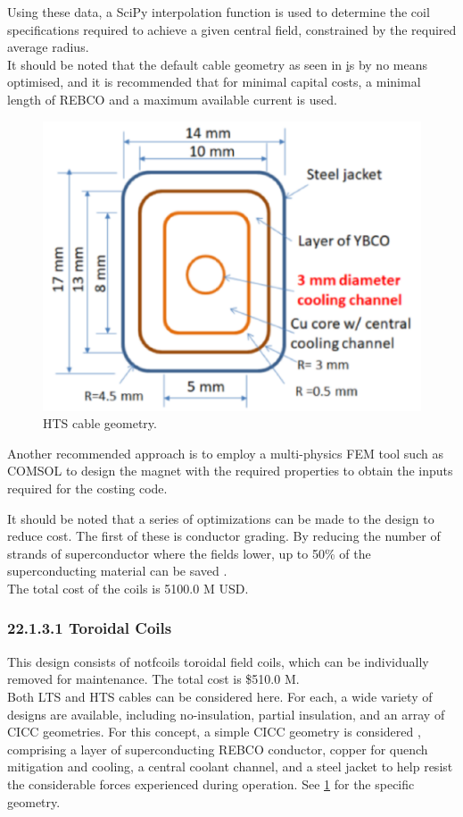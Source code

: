 Using these data, a SciPy interpolation function is used to determine the coil specifications required to achieve a given central field, constrained by the required average radius.\\

It should be noted that the default cable geometry as seen in \href{fig:yuhu_cs} is by no means optimised, and it is recommended that for minimal capital costs, a minimal length of REBCO and a maximum available current is used.


\begin{figure}[h]
    \centering
    \includegraphics[width =0.5\linewidth]{StandardFigures/yuhu_cs.pdf}
    \caption{HTS cable geometry.}
    \label{fig:yuhu_cs}
\end{figure}

Another recommended approach is to employ a multi-physics FEM tool such as COMSOL to design the magnet with the required properties to obtain the inputs required for the costing code.

It should be noted that a series of optimizations can be made to the design to reduce cost. The first of these is conductor grading. By reducing the number of strands of superconductor where the fields lower, up to 50\% of the superconducting material can be saved \cite{uglietti2018progressing}.\\

The total cost of the coils is 5100.0 M USD.


\subsubsection*{22.1.3.1 Toroidal Coils}

This design consists of notfcoils toroidal field coils, which can be individually removed for maintenance. The total cost is \$510.0 M.\\

Both LTS and HTS cables can be considered here. For each, a wide variety of designs are available, including no-insulation, partial insulation, and an array of CICC geometries. For this concept, a simple CICC geometry is considered \cite{Menard2016}, comprising a layer of superconducting REBCO conductor, copper for quench mitigation and cooling, a central coolant channel, and a steel jacket to help resist the considerable forces experienced during operation. See \ref{fig:yuhu_cs} for the specific geometry.\\

